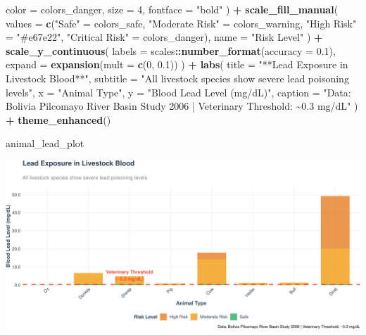 \documentclass[
]{article}
\newenvironment{Shaded}{\begin{snugshade}}{\end{snugshade}}
\newcommand{\AttributeTok}[1]{\textcolor[rgb]{0.13,0.29,0.53}{#1}}
\newcommand{\DecValTok}[1]{\textcolor[rgb]{0.00,0.00,0.81}{#1}}
\newcommand{\FloatTok}[1]{\textcolor[rgb]{0.00,0.00,0.81}{#1}}
\newcommand{\FunctionTok}[1]{\textcolor[rgb]{0.13,0.29,0.53}{\textbf{#1}}}
\newcommand{\NormalTok}[1]{#1}
\newcommand{\OtherTok}[1]{\textcolor[rgb]{0.56,0.35,0.01}{#1}}
\newcommand{\SpecialCharTok}[1]{\textcolor[rgb]{0.81,0.36,0.00}{\textbf{#1}}}
\newcommand{\StringTok}[1]{\textcolor[rgb]{0.31,0.60,0.02}{#1}}
\begin{document}
\begin{Shaded}
\begin{Highlighting}[]
    \AttributeTok{color =}\NormalTok{ colors\_danger,}
    \AttributeTok{size =} \DecValTok{4}\NormalTok{,}
    \AttributeTok{fontface =} \StringTok{"bold"}
\NormalTok{  ) }\SpecialCharTok{+}
  \FunctionTok{scale\_fill\_manual}\NormalTok{(}
    \AttributeTok{values =} \FunctionTok{c}\NormalTok{(}\StringTok{"Safe"} \OtherTok{=}\NormalTok{ colors\_safe, }
               \StringTok{"Moderate Risk"} \OtherTok{=}\NormalTok{ colors\_warning, }
               \StringTok{"High Risk"} \OtherTok{=} \StringTok{"\#e67e22"}\NormalTok{, }
               \StringTok{"Critical Risk"} \OtherTok{=}\NormalTok{ colors\_danger),}
    \AttributeTok{name =} \StringTok{"Risk Level"}
\NormalTok{  ) }\SpecialCharTok{+}
  \FunctionTok{scale\_y\_continuous}\NormalTok{(}
    \AttributeTok{labels =}\NormalTok{ scales}\SpecialCharTok{::}\FunctionTok{number\_format}\NormalTok{(}\AttributeTok{accuracy =} \FloatTok{0.1}\NormalTok{),}
    \AttributeTok{expand =} \FunctionTok{expansion}\NormalTok{(}\AttributeTok{mult =} \FunctionTok{c}\NormalTok{(}\DecValTok{0}\NormalTok{, }\FloatTok{0.1}\NormalTok{))}
\NormalTok{  ) }\SpecialCharTok{+}
  \FunctionTok{labs}\NormalTok{(}
    \AttributeTok{title =} \StringTok{"**Lead Exposure in Livestock Blood**"}\NormalTok{,}
    \AttributeTok{subtitle =} \StringTok{"All livestock species show severe lead poisoning levels"}\NormalTok{,}
    \AttributeTok{x =} \StringTok{"Animal Type"}\NormalTok{,}
    \AttributeTok{y =} \StringTok{"Blood Lead Level (mg/dL)"}\NormalTok{,}
    \AttributeTok{caption =} \StringTok{"Data: Bolivia Pilcomayo River Basin Study 2006 | Veterinary Threshold: \textasciitilde{}0.3 mg/dL"}
\NormalTok{  ) }\SpecialCharTok{+}
  \FunctionTok{theme\_enhanced}\NormalTok{()}

\NormalTok{animal\_lead\_plot}
\end{Highlighting}
\end{Shaded}

\includegraphics{WHO_standards_pdf_02_files/figure-latex/animal-lead-1.pdf}
\end{document}
